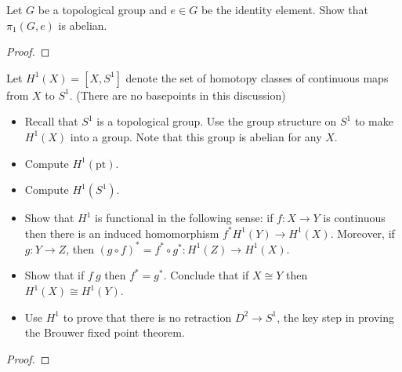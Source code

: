 \documentclass[12pt]{article}
\newenvironment{statement}[2][Statement]{\begin{trivlist}
\item[\hskip \labelsep {\bfseries #1}\hskip \labelsep {\bfseries #2.}]}{\end{trivlist}}
\begin{document}
\begin{statement}[Problem]{7}
  Let $G$ be a topological group and $e \in G$ be the identity element. Show that $\pi_1(G,e)$ is abelian. 
\end{statement}
\begin{proof}

\end{proof}

\begin{statement}[Problem]{8}
  Let $H^1(X)=[X,S^1]$ denote the set of homotopy classes of continuous maps from $X$ to $S^1$. (There are no basepoints in this discussion)
  \begin{itemize}
    \item[(a)] Recall that $S^1$ is a topological group. Use the group structure on $S^1$ to make $H^1(X)$ into a group. Note that this group is abelian for any $X$. 
    \item[(b)] Compute $H^1(\text{{pt}})$.
    \item[(c)] Compute $H^1(S^1)$.
    \item[(d)] Show that $H^1$ is functional in the following sense: if $f: X \to Y$ is continuous then there is an induced homomorphism 
      $f^*H^1(Y) \to H^1(X)$. Moreover, if $g: Y \to Z$, then $(g \circ f)^* = f^* \circ g^*: H^1(Z) \to H^1(X)$.
    \item[(e)] Show that if $f ~ g$ then $f^* = g^*$. Conclude that if $X \cong Y$ then $H^1(X) \cong H^1(Y)$.
    \item[(f)] Use $H^1$ to prove that there is no retraction $D^2 \to S^1$, the key step in proving the Brouwer fixed point theorem.  
  \end{itemize}
\end{statement}
\begin{proof}

\end{proof}
\end{document}
